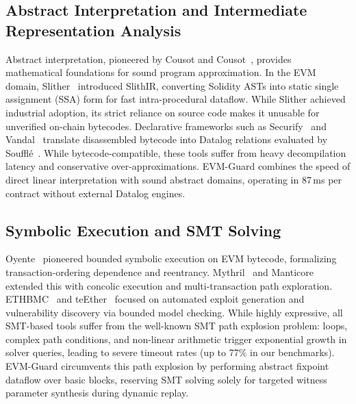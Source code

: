 \documentclass[conference]{IEEEtran}
\begin{document}
\subsection{Abstract Interpretation and Intermediate Representation Analysis}
Abstract interpretation, pioneered by Cousot and Cousot~\cite{cousot1977abstract}, provides mathematical foundations for sound program approximation. In the EVM domain, Slither~\cite{feist2019slither} introduced SlithIR, converting Solidity ASTs into static single assignment (SSA) form for fast intra-procedural dataflow. While Slither achieved industrial adoption, its strict reliance on source code makes it unusable for unverified on-chain bytecodes. Declarative frameworks such as Securify~\cite{tsankov2018securify} and Vandal~\cite{brent2018vandal} translate disassembled bytecode into Datalog relations evaluated by Souffl{\'e}~\cite{scholz2016souffle}. While bytecode-compatible, these tools suffer from heavy decompilation latency and conservative over-approximations. EVM-Guard combines the speed of direct linear interpretation with sound abstract domains, operating in 87\,ms per contract without external Datalog engines.

\subsection{Symbolic Execution and SMT Solving}
Oyente~\cite{luu2016making} pioneered bounded symbolic execution on EVM bytecode, formalizing transaction-ordering dependence and reentrancy. Mythril~\cite{mueller2018mythril} and Manticore~\cite{mossberg2019manticore} extended this with concolic execution and multi-transaction path exploration. ETHBMC~\cite{frank2020ethbmc} and teEther~\cite{krupp2018teether} focused on automated exploit generation and vulnerability discovery via bounded model checking. While highly expressive, all SMT-based tools suffer from the well-known SMT path explosion problem: loops, complex path conditions, and non-linear arithmetic trigger exponential growth in solver queries, leading to severe timeout rates (up to 77\% in our benchmarks). EVM-Guard circumvents this path explosion by performing abstract fixpoint dataflow over basic blocks, reserving SMT solving solely for targeted witness parameter synthesis during dynamic replay.
\end{document}
